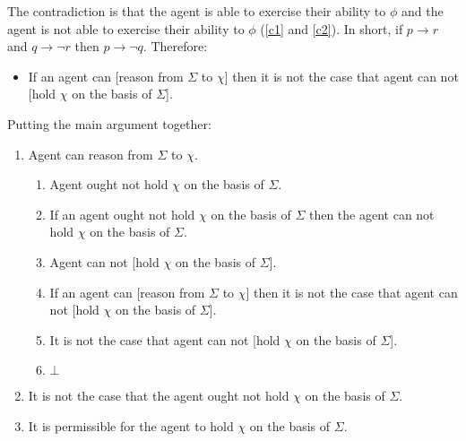 \documentclass[10pt]{article}
\begin{document}
The contradiction is that the agent is able to exercise their ability to \(\phi\) and the agent is not able to exercise their ability to \(\phi\) (\ref{c1} and \ref{c2}).
In short, if \(p \rightarrow r\) and \(q \rightarrow \lnot r\) then \(p \rightarrow \lnot q\).
Therefore:

\begin{itemize}
\item If an agent can [reason from \(\Sigma\) to \(\chi\)] then it is not the case that agent can not [hold \(\chi\) on the basis of \(\Sigma\)].
\end{itemize}

Putting the main argument together:

\begin{enumerate}
\item Agent can reason from \(\Sigma\) to \(\chi\).
  \begin{enumerate}
  \item Agent ought not hold \(\chi\) on the basis of \(\Sigma\).
  \item If an agent ought not hold \(\chi\) on the basis of \(\Sigma\) then the agent can not hold \(\chi\) on the basis of \(\Sigma\).
  \item Agent can not [hold \(\chi\) on the basis of \(\Sigma\)].
  \item If an agent can [reason from \(\Sigma\) to \(\chi\)] then it is not the case that agent can not [hold \(\chi\) on the basis of \(\Sigma\)].
  \item It is not the case that agent can not [hold \(\chi\) on the basis of \(\Sigma\)].
  \item \(\bot\)
  \end{enumerate}
\item It is not the case that the agent ought not hold \(\chi\) on the basis of \(\Sigma\).
\item It is permissible for the agent to hold \(\chi\) on the basis of \(\Sigma\).
\end{enumerate}

\newpage

\printbibliography
\end{document}
